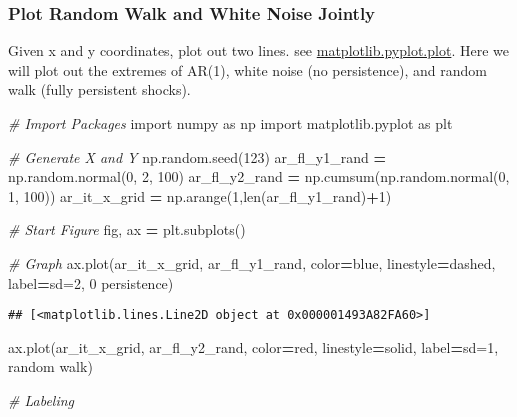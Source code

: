 \documentclass[
]{book}
\newenvironment{Shaded}{\begin{snugshade}}{\end{snugshade}}
\newcommand{\BuiltInTok}[1]{#1}
\newcommand{\CommentTok}[1]{\textcolor[rgb]{0.56,0.35,0.01}{\textit{#1}}}
\newcommand{\DecValTok}[1]{\textcolor[rgb]{0.00,0.00,0.81}{#1}}
\newcommand{\ImportTok}[1]{#1}
\newcommand{\NormalTok}[1]{#1}
\newcommand{\OperatorTok}[1]{\textcolor[rgb]{0.81,0.36,0.00}{\textbf{#1}}}
\newcommand{\StringTok}[1]{\textcolor[rgb]{0.31,0.60,0.02}{#1}}
\begin{document}
\hypertarget{plot-random-walk-and-white-noise-jointly}{%
\subsubsection{Plot Random Walk and White Noise Jointly}\label{plot-random-walk-and-white-noise-jointly}}

Given x and y coordinates, plot out two lines. see \href{https://matplotlib.org/2.1.1/api/_as_gen/matplotlib.pyplot.plot.html}{matplotlib.pyplot.plot}. Here we will plot out the extremes of AR(1), white noise (no persistence), and random walk (fully persistent shocks).

\begin{Shaded}
\begin{Highlighting}[]
\CommentTok{\# Import Packages}
\ImportTok{import}\NormalTok{ numpy }\ImportTok{as}\NormalTok{ np}
\ImportTok{import}\NormalTok{ matplotlib.pyplot }\ImportTok{as}\NormalTok{ plt}

\CommentTok{\# Generate X and Y}
\NormalTok{np.random.seed(}\DecValTok{123}\NormalTok{)}
\NormalTok{ar\_fl\_y1\_rand }\OperatorTok{=}\NormalTok{ np.random.normal(}\DecValTok{0}\NormalTok{, }\DecValTok{2}\NormalTok{, }\DecValTok{100}\NormalTok{)}
\NormalTok{ar\_fl\_y2\_rand }\OperatorTok{=}\NormalTok{ np.cumsum(np.random.normal(}\DecValTok{0}\NormalTok{, }\DecValTok{1}\NormalTok{, }\DecValTok{100}\NormalTok{))}
\NormalTok{ar\_it\_x\_grid }\OperatorTok{=}\NormalTok{ np.arange(}\DecValTok{1}\NormalTok{,}\BuiltInTok{len}\NormalTok{(ar\_fl\_y1\_rand)}\OperatorTok{+}\DecValTok{1}\NormalTok{)}

\CommentTok{\# Start Figure}
\NormalTok{fig, ax }\OperatorTok{=}\NormalTok{ plt.subplots()}

\CommentTok{\# Graph}
\NormalTok{ax.plot(ar\_it\_x\_grid, ar\_fl\_y1\_rand,}
\NormalTok{                     color}\OperatorTok{=}\StringTok{\textquotesingle{}blue\textquotesingle{}}\NormalTok{, linestyle}\OperatorTok{=}\StringTok{\textquotesingle{}dashed\textquotesingle{}}\NormalTok{,}
\NormalTok{                     label}\OperatorTok{=}\StringTok{\textquotesingle{}sd=2, 0 persistence\textquotesingle{}}\NormalTok{)}
\end{Highlighting}
\end{Shaded}

\begin{verbatim}
## [<matplotlib.lines.Line2D object at 0x000001493A82FA60>]
\end{verbatim}

\begin{Shaded}
\begin{Highlighting}[]
\NormalTok{ax.plot(ar\_it\_x\_grid, ar\_fl\_y2\_rand,}
\NormalTok{                     color}\OperatorTok{=}\StringTok{\textquotesingle{}red\textquotesingle{}}\NormalTok{, linestyle}\OperatorTok{=}\StringTok{\textquotesingle{}solid\textquotesingle{}}\NormalTok{,}
\NormalTok{                     label}\OperatorTok{=}\StringTok{\textquotesingle{}sd=1, random walk\textquotesingle{}}\NormalTok{)}
                     
\CommentTok{\# Labeling}
\end{Highlighting}
\end{Shaded}
\end{document}
